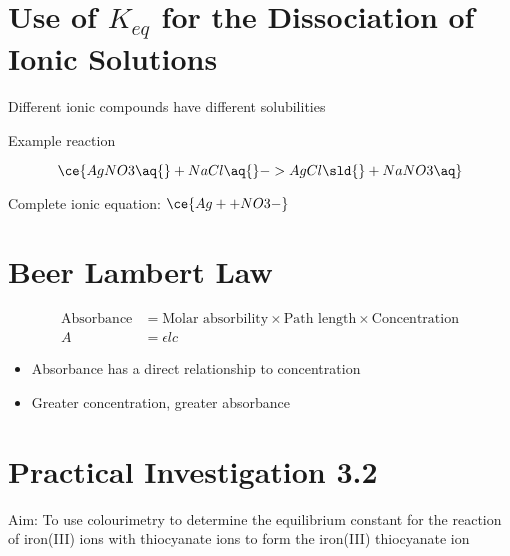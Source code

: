 \section{Use of $K_{eq}$ for the Dissociation of Ionic Solutions} \label{12/11/2024}
	Different ionic compounds have different solubilities

	Example reaction

	$$\ce{AgNO3 \aq{} + NaCl \aq{} -> AgCl \sld{} + NaNO3 \aq}$$

	Complete ionic equation: $\ce{Ag+ + NO3-}$
	
	\section{Beer Lambert Law} \label{14/11/2024}
	\begin{align*}
		\text{Absorbance} &= \text{Molar absorbility} \times \text{Path length} \times \text{Concentration} \\
		A &= \epsilon lc
	\end{align*}
	\begin{itemize}
		\item Absorbance has a direct relationship to concentration
		\item Greater concentration, greater absorbance
	\end{itemize}
	
\section{Practical Investigation 3.2}
	Aim: To use colourimetry to determine the equilibrium constant for the reaction of iron(III) ions with thiocyanate ions to form the iron(III) thiocyanate ion

